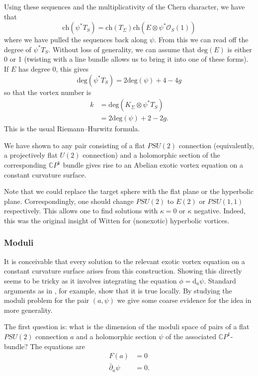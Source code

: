 \documentclass[10pt]{article}
\newcommand{\mc}[1]{\mathcal{#1}}
\newcommand{\dd}{\textrm{d}}
\newcommand{\db}{\bar{\partial}}
\theoremstyle{definition}
\begin{document}
Using these sequences and the multiplicativity of the Chern character, we have that
\[
\text{ch}(\psi^* T_S) = \text{ch}(T_\Sigma) \text{ch}(E \otimes \psi^* \mc{O}_S(1)) 
\]
where we have pulled the sequences back along \(\psi\). From this we can read off the degree of \(\psi^*T_S\). Without loss of generality, we can assume that \(\text{deg}(E) \) is either 0 or 1 (twisting with a line bundle allows us to bring it into one of these forms). If \(E\) has degree 0, this gives
\[
\text{deg}(\psi^*T_S) = 2 \text{deg}(\psi) + 4 - 4g
\]
so that the vortex number is
\begin{align*}
k &= \text{deg}(K_\Sigma \otimes \psi^*T_S) \\
	&= 2\text{deg}(\psi) + 2 - 2g \text{.}
\end{align*}
This is the usual Riemann--Hurwitz formula. 

We have shown to any pair consisting of a flat \(PSU(2)\) connection (equivalently, a projectively flat \(U(2)\) connection) and a holomorphic section of the corresponding \(\mathbb{C}P^1\) bundle gives rise to an Abelian exotic vortex equation on a constant curvature surface. 

Note that we could replace the target sphere with the flat plane or the hyperbolic plane. Correspondingly, one should change \(PSU(2)\) to \(E(2)\) or \(PSU(1,1)\) respectively. This allows one to find solutions with \(\kappa = 0\) or \(\kappa\) negative. Indeed, this was the original insight of Witten \cite{wittenMPS} for (nonexotic) hyperbolic vortices.



\subsubsection{Moduli}


It is conceivable that every solution to the relevant exotic vortex equation on a constant curvature surface arises from this construction. Showing this directly seems to be tricky as it involves integrating the equation \(\phi = \dd_a \psi\). Standard arguments as in \cite{mantonFVE}, for example, show that it is true locally. By studying the moduli problem for the pair \((a, \psi)\) we give some coarse evidence for the idea in more generality.

The first question is: what is the dimension of the moduli space of pairs of a flat \(PSU(2)\) connection \(a\) and a holomorphic section \(\psi\) of the associated \(\mathbb{C}P^1\)-bundle? The equations are
\begin{equation}
\label{eq:holeqs}
\begin{aligned}
F(a) &= 0 \\
\db_a \psi &= 0 \text{.}
\end{aligned}
\end{equation}
\end{document}
